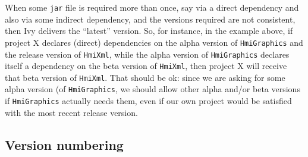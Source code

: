 When some \verb"jar" file is required more than once, say via a direct dependency and also via some indirect dependency,
and the versions required are not consistent, then Ivy delivers the ``latest'' version.
So, for instance, in the example above, if project X declares (direct) dependencies on the alpha version of \verb"HmiGraphics" and the release version of \verb"HmiXml", while the alpha version of \verb"HmiGraphics"
declares itself a dependency on the beta version of \verb"HmiXml", then project X will receive that beta version
of \verb"HmiXml". That should be ok: since we are asking for some alpha version (of \verb"HmiGraphics",
we should allow other alpha and/or beta versions if \verb"HmiGraphics" actually needs them, even if our own project
would be satisfied with the most recent release version.

\subsection{Version numbering}

